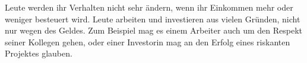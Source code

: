 Leute werden ihr Verhalten nicht sehr ändern, wenn ihr Einkommen mehr oder weniger besteuert wird.
Leute arbeiten und investieren aus vielen Gründen, nicht nur wegen des Geldes.
Zum Beispiel mag es einem Arbeiter auch um den Respekt seiner Kollegen gehen, oder einer Investorin mag an den Erfolg eines riskanten Projektes glauben.